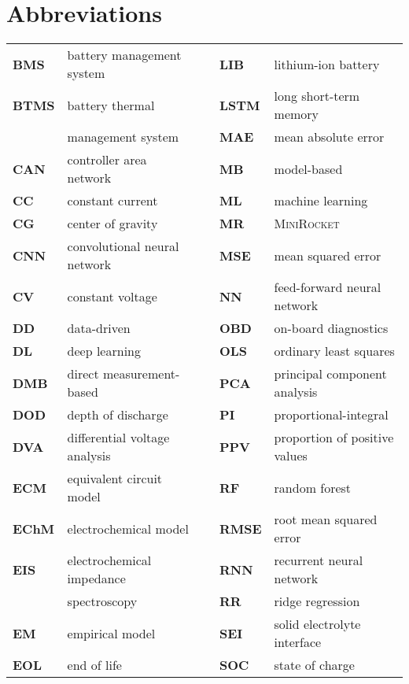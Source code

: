 \chapter*{Abbreviations}

\begin{table*}
\small
\begin{tabular}{llcll}
\textbf{BMS} & battery management system & \phantom{a} & \textbf{LIB} & lithium-ion battery\\
\textbf{BTMS} & battery thermal && \textbf{LSTM} & long short-term memory\\
& management system && \textbf{MAE} & mean absolute error\\
\textbf{CAN} & controller area network && \textbf{MB} & model-based\\
\textbf{CC} & constant current && \textbf{ML} & machine learning\\
\textbf{CG} & center of gravity && \textbf{MR} & \textsc{MiniRocket}\\
\textbf{CNN} & convolutional neural network && \textbf{MSE} & mean squared error\\
\textbf{CV} & constant voltage && \textbf{NN} & feed-forward neural network\\
\textbf{DD} & data-driven && \textbf{OBD} & on-board diagnostics\\
\textbf{DL} & deep learning && \textbf{OLS} & ordinary least squares\\
\textbf{DMB} & direct measurement-based && \textbf{PCA} & principal component analysis\\
\textbf{DOD} & depth of discharge && \textbf{PI} & proportional-integral\\
\textbf{DVA} & differential voltage analysis && \textbf{PPV} & proportion of positive values\\
\textbf{ECM} & equivalent circuit model && \textbf{RF} & random forest\\
\textbf{EChM} & electrochemical model && \textbf{RMSE} & root mean squared error\\
\textbf{EIS} & electrochemical impedance && \textbf{RNN} & recurrent neural network\\
& spectroscopy && \textbf{RR} & ridge regression\\
\textbf{EM} & empirical model && \textbf{SEI} & solid electrolyte interface\\
\textbf{EOL} & end of life && \textbf{SOC} & state of charge\\

\end{tabular}
\end{table*}
